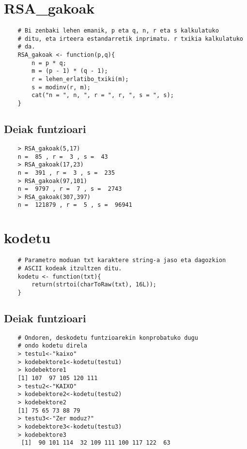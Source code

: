 \documentclass[12pt]{basque-book}
\begin{document}
\newpage

\section{RSA\_gakoak}
\begin{verbatim}
    # Bi zenbaki lehen emanik, p eta q, n, r eta s kalkulatuko 
    # ditu, eta irteera estandarretik inprimatu. r txikia kalkulatuko
    # da.
    RSA_gakoak <- function(p,q){
        n = p * q;
        m = (p - 1) * (q - 1);
        r = lehen_erlatibo_txiki(m);
        s = modinv(r, m);
        cat("n = ", n, ", r = ", r, ", s = ", s); 
    }
\end{verbatim}
\subsection{Deiak funtzioari}
\begin{verbatim}
    > RSA_gakoak(5,17)
    n =  85 , r =  3 , s =  43
    > RSA_gakoak(17,23)
    n =  391 , r =  3 , s =  235
    > RSA_gakoak(97,101)
    n =  9797 , r =  7 , s =  2743
    > RSA_gakoak(307,397)
    n =  121879 , r =  5 , s =  96941
\end{verbatim}

\newpage

\section{kodetu}
\begin{verbatim}
    # Parametro moduan txt karaktere string-a jaso eta dagozkion  
    # ASCII kodeak itzultzen ditu.
    kodetu <- function(txt){
        return(strtoi(charToRaw(txt), 16L));
    }
\end{verbatim}

\subsection{Deiak funtzioari}
\begin{verbatim}
    # Ondoren, deskodetu funtzioarekin konprobatuko dugu  
    # ondo kodetu direla
    > testu1<-"kaixo"
    > kodebektore1<-kodetu(testu1)
    > kodebektore1
    [1] 107  97 105 120 111
    > testu2<-"KAIXO"
    > kodebektore2<-kodetu(testu2)
    > kodebektore2
    [1] 75 65 73 88 79
    > testu3<-"Zer moduz?"
    > kodebektore3<-kodetu(testu3)
    > kodebektore3
     [1]  90 101 114  32 109 111 100 117 122  63
\end{verbatim}

\newpage
\end{document}
